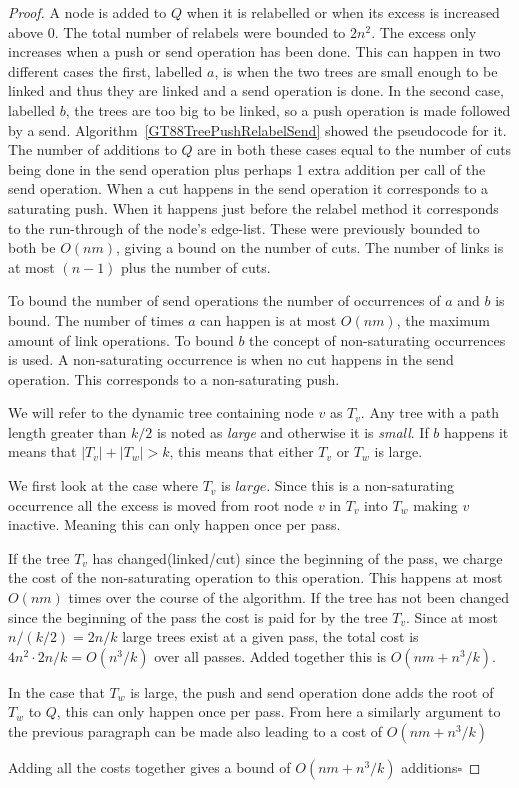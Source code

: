 \begin{proof}
	A node is added to $Q$ when it is relabelled or when its excess is increased above 0. The total number of relabels were bounded to $2n^2$. 
	The excess only increases when a push or send operation has been done.
	This can happen in two different cases the first, labelled $a$, is when the two trees are small enough to be linked 
	and thus they are linked and a send operation is done. In the second case, labelled $b$, the trees are too big to be
	linked, so a push operation is made followed by a send. Algorithm~\ref{GT88TreePushRelabelSend} showed
	the pseudocode for it. The number of additions to $Q$ are in both these cases equal to the number of cuts being
	done in the send operation plus perhaps 1 extra addition per call of the send operation. 
	When a cut happens in the send operation it corresponds to a saturating push.
	When it happens just before the relabel method it corresponds to the run-through of the node's edge-list. These were
	previously bounded to both be $O(nm)$, giving a bound on the number of cuts. The number of links is at most $(n-1)$ plus the number of cuts.	
	
	To bound the number of send operations the number of occurrences of $a$ and $b$ is bound. 	
	The number of times $a$ can happen is at most $O(nm)$, the maximum amount of link operations. 	
	To bound $b$ the concept of non-saturating occurrences is used. A non-saturating occurrence is when no cut happens 
	in the send operation. This corresponds to a non-saturating push.
	
	We will refer to the dynamic tree containing node $v$ as $T_v$. 
	Any tree with a path length greater than $k/2$ is noted as \emph{large} and otherwise it is \emph{small}.
	If $b$ happens it means that $|T_v| + |T_w| > k$, this means that either $T_v$ or $T_w$ is large. 
	
	We first look at the case where $T_v$ is $large$. Since this is a non-saturating occurrence all the excess is moved from root node $v$ in $T_v$
	into $T_w$ making $v$ inactive. Meaning this can only happen once per pass. 
	
	If the tree $T_v$ has changed(linked/cut) since the beginning of the pass, we charge the cost of the non-saturating operation to this operation. 
	This happens at most $O(nm)$ times over the course of the algorithm. If the tree
	has not been changed since the beginning of the pass the cost is paid for by the tree $T_v$. Since at most $n/(k/2) = 2n/k$ large
	trees exist at a given pass, the total cost is $4n^2 \cdot 2n/k = O(n^3/k)$ over all passes. Added together this is $O(nm+n^3/k)$.
	
	In the case that $T_w$ is large, the push and send operation done adds the root of $T_w$ to $Q$, this can only happen once per pass.
	From here a similarly argument to the previous paragraph can be made also leading to a cost of $O(nm+n^3/k)$
	
	Adding all the costs together gives a bound of $O(nm+n^3/k)$ additions$\square$
\end{proof}

